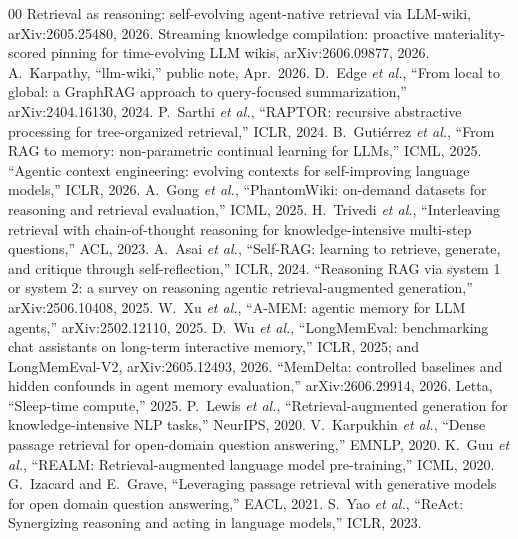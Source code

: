 \documentclass[conference]{IEEEtran}
\begin{document}
\begin{thebibliography}{00}
 Retrieval as reasoning: self-evolving agent-native retrieval
via LLM-wiki, arXiv:2605.25480, 2026.
 Streaming knowledge compilation: proactive
materiality-scored pinning for time-evolving LLM wikis, arXiv:2606.09877, 2026.
 A.~Karpathy, ``llm-wiki,'' public note, Apr.\ 2026.
 D.~Edge \emph{et al.}, ``From local to global: a GraphRAG approach
to query-focused summarization,'' arXiv:2404.16130, 2024.
 P.~Sarthi \emph{et al.}, ``RAPTOR: recursive abstractive processing
for tree-organized retrieval,'' ICLR, 2024.
 B.~Guti\'errez \emph{et al.}, ``From RAG to memory:
non-parametric continual learning for LLMs,'' ICML, 2025.
 ``Agentic context engineering: evolving contexts for self-improving
language models,'' ICLR, 2026.
 A.~Gong \emph{et al.}, ``PhantomWiki: on-demand datasets for
reasoning and retrieval evaluation,'' ICML, 2025.
 H.~Trivedi \emph{et al.}, ``Interleaving retrieval with
chain-of-thought reasoning for knowledge-intensive multi-step questions,'' ACL, 2023.
 A.~Asai \emph{et al.}, ``Self-RAG: learning to retrieve, generate,
and critique through self-reflection,'' ICLR, 2024.
 ``Reasoning RAG via system 1 or system 2: a survey on
reasoning agentic retrieval-augmented generation,'' arXiv:2506.10408, 2025.
 W.~Xu \emph{et al.}, ``A-MEM: agentic memory for LLM agents,''
arXiv:2502.12110, 2025.
 D.~Wu \emph{et al.}, ``LongMemEval: benchmarking chat
assistants on long-term interactive memory,'' ICLR, 2025; and LongMemEval-V2,
arXiv:2605.12493, 2026.
 ``MemDelta: controlled baselines and hidden confounds in agent
memory evaluation,'' arXiv:2606.29914, 2026.
 Letta, ``Sleep-time compute,'' 2025.
 P.~Lewis \emph{et al.}, ``Retrieval-augmented generation
for knowledge-intensive NLP tasks,'' NeurIPS, 2020.
 V.~Karpukhin \emph{et al.}, ``Dense passage retrieval for
open-domain question answering,'' EMNLP, 2020.
 K.~Guu \emph{et al.}, ``REALM: Retrieval-augmented language
model pre-training,'' ICML, 2020.
 G.~Izacard and E.~Grave, ``Leveraging passage retrieval with
generative models for open domain question answering,'' EACL, 2021.
 S.~Yao \emph{et al.}, ``ReAct: Synergizing reasoning and
acting in language models,'' ICLR, 2023.

\end{thebibliography}
\end{document}

